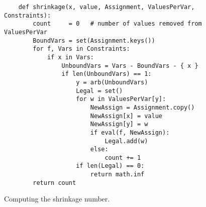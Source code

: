 \begin{figure}[!ht]
\centering
\begin{verbatim}
    def shrinkage(x, value, Assignment, ValuesPerVar, Constraints):
        count     = 0   # number of values removed from ValuesPerVar
        BoundVars = set(Assignment.keys())
        for f, Vars in Constraints:
            if x in Vars:
                UnboundVars = Vars - BoundVars - { x }
                if len(UnboundVars) == 1:
                    y = arb(UnboundVars)
                    Legal = set()
                    for w in ValuesPerVar[y]:
                        NewAssign = Assignment.copy()
                        NewAssign[x] = value
                        NewAssign[y] = w
                        if eval(f, NewAssign):
                            Legal.add(w)
                        else:
                            count += 1
                    if len(Legal) == 0:
                        return math.inf
        return count           
\end{verbatim}
\vspace*{-0.3cm}
\caption{Computing the shrinkage number.}
\label{fig:Constraint-Propagation-Solver.ipynb:shrinkage}
\end{figure}

